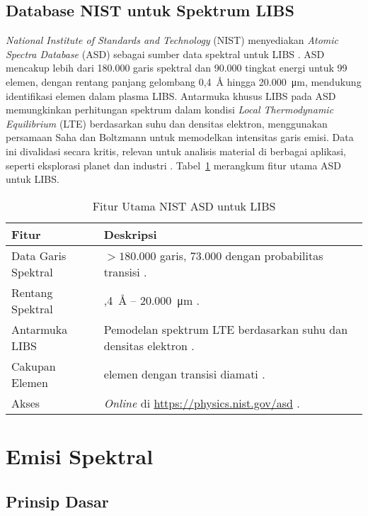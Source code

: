 \subsection{Database NIST untuk Spektrum LIBS}
\label{subsec:nist_database}

\textit{National Institute of Standards and Technology} (NIST) menyediakan \textit{Atomic Spectra Database} (ASD) sebagai sumber data spektral untuk LIBS \citep{Kramida2023}. ASD mencakup lebih dari 180.000 garis spektral dan 90.000 tingkat energi untuk 99 elemen, dengan rentang panjang gelombang 0,4~\AA{} hingga 20.000~\si{\micro\meter}, mendukung identifikasi elemen dalam plasma LIBS. Antarmuka khusus LIBS pada ASD memungkinkan perhitungan spektrum dalam kondisi \textit{Local Thermodynamic Equilibrium} (LTE) berdasarkan suhu dan densitas elektron, menggunakan persamaan Saha dan Boltzmann untuk memodelkan intensitas garis emisi. Data ini divalidasi secara kritis, relevan untuk analisis material di berbagai aplikasi, seperti eksplorasi planet dan industri \citep{Kramida2022}. Tabel~\ref{tab:nist_features} merangkum fitur utama ASD untuk LIBS.

\begin{table}[H]
\centering
\caption{Fitur Utama NIST ASD untuk LIBS}
\label{tab:nist_features}
\begin{tabularx}{\textwidth}{>{\raggedright\arraybackslash}X>{\raggedright\arraybackslash}X}
\toprule
\textbf{Fitur} & \textbf{Deskripsi} \\
\midrule
Data Garis Spektral & $>180.000$ garis, 73.000 dengan probabilitas transisi \citep{Kramida2023}. \\
Rentang Spektral & 0,4~\AA{} -- 20.000~\si{\micro\meter} \citep{Kramida2023}. \\
Antarmuka LIBS & Pemodelan spektrum LTE berdasarkan suhu dan densitas elektron \citep{Kramida2023}. \\
Cakupan Elemen & 99 elemen dengan transisi diamati \citep{Kramida2023}. \\
Akses & \textit{Online} di \url{https://physics.nist.gov/asd} \citep{Kramida2023}. \\
\bottomrule
\end{tabularx}
\end{table}
\section{Emisi Spektral}
\subsection{Prinsip Dasar}

